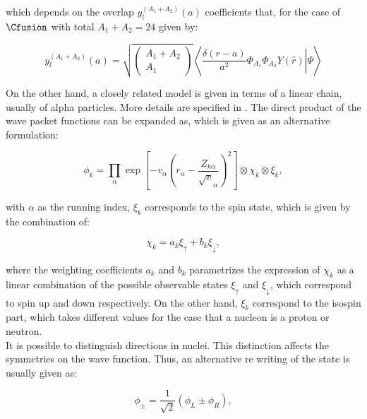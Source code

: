 \documentclass[openany]{book}
\begin{document}
which depends on the overlap $y^{(A_1 + A_2)}_l(a) $ coefficients that, for the case of $\Cfusion$ with total $A_1 +	 A_2 = 24$ given by: 

\begin{equation}\label{eq:middleFusion_decayRate_overlap}
	y^{(A_1 + A_2)}_l(a) = \sqrt { \left (\begin{array}{c}
			A_1 + A_2 \\ A_1
		\end{array} \right) } \left \langle  \left.\frac{\delta(r - a)}{a^2} \Phi_{A_1} \Phi_{A_2} Y(\hat r)\right| \Psi \right \rangle
\end{equation}


On the other hand, a closely related model is given in terms of a linear chain, usually of alpha particles. More details are specified in \cite{baba_taniguchi_kimura_2022}. The direct product of the wave packet functions can be expanded as, which is given as an alternative formulation: 

\begin{equation}\label{eq:micro_linearChain_waveFunction}
	\phi_k = \prod_{\alpha} {\exp \left [- v_\alpha \left ( r_\alpha - \frac{Z_{k\alpha}}{\sqrt v_\alpha} \right )^2 \right]} \otimes \chi_k \otimes \xi_k,
\end{equation} 

with $\alpha$ as the running index, $\xi_k$ corresponds to the spin state, which is given by the combination of: 

\begin{equation}\label{eq:micro_linearChain_chi}
	\chi_k = a_k \xi_{\uparrow} + b_k \xi_\downarrow,
\end{equation} 

where the weighting coefficients $ a_k$ and $b_k $ parametrizes the expression of $\chi_k$ as a linear combination of the possible observable states $\xi_{\uparrow}  $ and $\xi_\downarrow$, which correspond to spin up and down respectively. On the other hand, $\xi_k$ correspond to the isospin part, which takes different values for the case that a nucleon is a proton or neutron. \\


It is possible to distinguish directions in nuclei. This distinction affects the symmetries on the wave function. Thus, an alternative re writing of the state is usually given as: 

\begin{equation}\label{eq:micro_linearChain_2state}
	\phi_\pm = \frac{1}{\sqrt{2}} (\phi_L \pm \phi_R),
\end{equation} 
\end{document}
